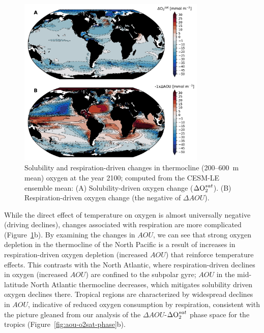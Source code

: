\documentclass[draft,linenumbers]{report_chapter}
\begin{document}
\begin{figure}[tbp]
\centering
\includegraphics[width=0.8\textwidth]{cesm-thermocline-o2-change-sat-aou.pdf}
\caption{Solubility and respiration-driven changes in thermocline (200--600~m mean) oxygen at the year 2100; computed from the CESM-LE ensemble mean:
(A) Solubility-driven oxygen change ($\Delta\ce{O2}^{sat}$).
(B) Respiration-driven oxygen change (the negative of $\Delta{}AOU$).}
\label{fig:cesm-thermocline-o2sat-aou-change}
\end{figure}

While the direct effect of temperature on oxygen is almost universally negative (driving declines), changes associated with respiration are more complicated (Figure~\ref{fig:cesm-thermocline-o2sat-aou-change}b).
By examining the changes in $AOU$, we can see that strong oxygen depletion in the thermocline of the North Pacific is a result of increases in respiration-driven oxygen depletion (increased $AOU$) that reinforce temperature effects.
This contrasts with the North Atlantic, where respiration-driven declines in oxygen (increased $AOU$) are confined to the subpolar gyre; $AOU$ in the mid-latitude North Atlantic thermocline decreases, which mitigates solubility driven oxygen declines there.
Tropical regions are characterized by widespread declines in $AOU$, indicative of reduced oxygen consumption by respiration, consistent with the picture gleaned from our analysis of the $\Delta AOU$-$\Delta\ce{O2}^{sat}$ phase space for the tropics (Figure~\ref{fig:aou-o2sat-phase}b).
\end{document}
